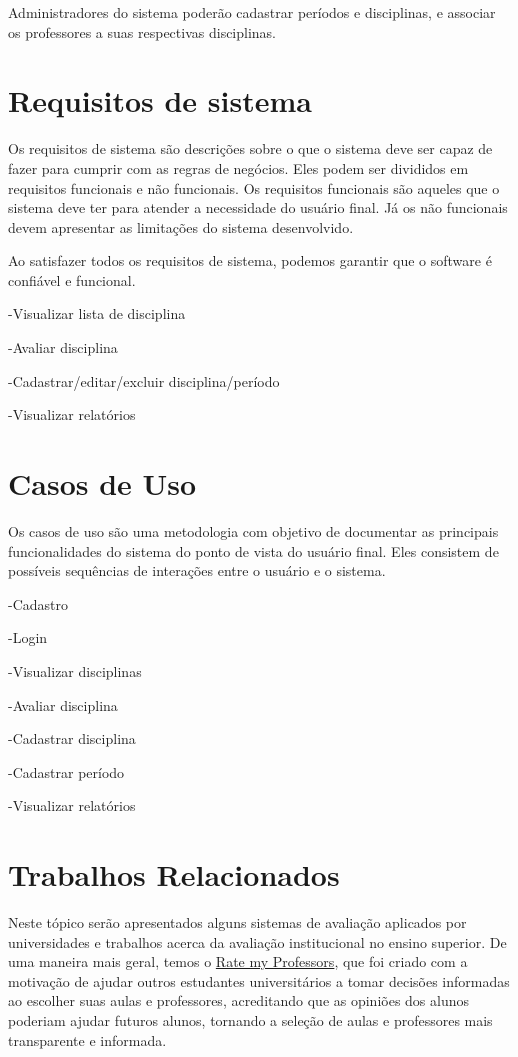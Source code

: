Administradores do sistema poderão cadastrar períodos e disciplinas, e associar os professores a suas respectivas disciplinas. 

\section{Requisitos de sistema}
Os requisitos de sistema são descrições sobre o que o sistema deve ser capaz de fazer para cumprir com as regras de negócios. Eles podem ser divididos em requisitos funcionais e não funcionais. Os requisitos funcionais são aqueles que o sistema deve ter para atender a necessidade do usuário final. Já os não funcionais devem apresentar as limitações do sistema desenvolvido.

Ao satisfazer todos os requisitos de sistema, podemos garantir que o software é confiável e funcional.

-Visualizar lista de disciplina

-Avaliar disciplina

-Cadastrar/editar/excluir disciplina/período

-Visualizar relatórios

\section{Casos de Uso}
Os casos de uso são uma metodologia com objetivo de documentar as principais funcionalidades do sistema do ponto de vista do usuário final. Eles consistem de possíveis sequências de interações entre o usuário e o sistema.

-Cadastro

-Login

-Visualizar disciplinas

-Avaliar disciplina

-Cadastrar disciplina

-Cadastrar período

-Visualizar relatórios

\section{Trabalhos Relacionados}
Neste tópico serão apresentados alguns sistemas de avaliação aplicados por universidades e trabalhos acerca da avaliação institucional no ensino superior.
De uma maneira mais geral, temos o \href{https://www.ratemyprofessors.com/}{Rate my Professors}, que foi criado
com a motivação de ajudar outros estudantes universitários a tomar decisões informadas ao escolher suas aulas e professores, acreditando que as opiniões dos alunos poderiam ajudar futuros alunos, tornando a seleção de aulas e professores mais transparente e informada.

